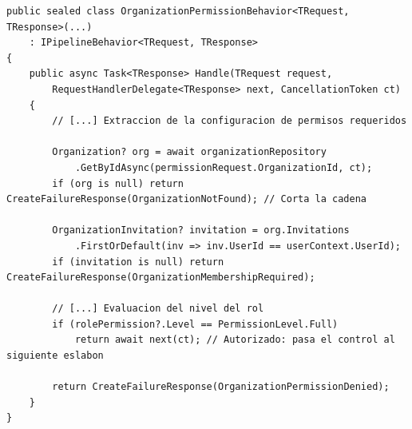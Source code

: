 \begin{lstlisting}[float=htbp, style=CSharp, caption={Validación en cascada mediante Chain of Responsibility.}, label={lst:permission_validation}]
public sealed class OrganizationPermissionBehavior<TRequest, TResponse>(...) 
    : IPipelineBehavior<TRequest, TResponse>
{
    public async Task<TResponse> Handle(TRequest request, 
        RequestHandlerDelegate<TResponse> next, CancellationToken ct)
    {
        // [...] Extraccion de la configuracion de permisos requeridos
        
        Organization? org = await organizationRepository
            .GetByIdAsync(permissionRequest.OrganizationId, ct);
        if (org is null) return CreateFailureResponse(OrganizationNotFound); // Corta la cadena

        OrganizationInvitation? invitation = org.Invitations
            .FirstOrDefault(inv => inv.UserId == userContext.UserId);
        if (invitation is null) return CreateFailureResponse(OrganizationMembershipRequired);

        // [...] Evaluacion del nivel del rol
        if (rolePermission?.Level == PermissionLevel.Full) 
            return await next(ct); // Autorizado: pasa el control al siguiente eslabon
            
        return CreateFailureResponse(OrganizationPermissionDenied);
    }
}
\end{lstlisting}